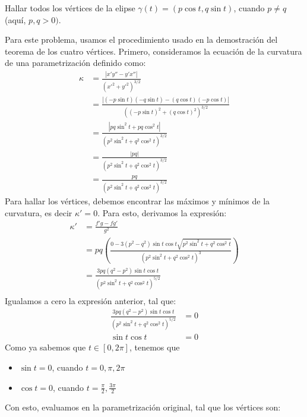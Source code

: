 \begin{problema}
    Hallar todos los vértices de la elipse $\gamma(t)=(p \cos t, q \sin t)$, cuando $p \neq q$ (aquí, $p, q>0)$.
    \begin{sol}
        Para este problema, usamos el procedimiento usado en la demostración del teorema de los cuatro vértices. 
        Primero, consideramos la ecuación de la curvatura de una parametrización definido como: 
        \begin{align*}
            \kappa &= \frac{|x'y''-y'x''|}{(x'^2+y'^2)^{3/2}}\\
            &= \frac{|(-p\sin t)(-q\sin t)-(q\cos t)(-p\cos t)|}{((-p\sin t)^2+(q\cos t)^2)^{3/2}}\\
            &= \frac{|pq\sin^2 t+pq \cos^2 t|}{(p^2\sin^2 t+q^2\cos^2 t)^{3/2}}\\
            &= \frac{|pq|}{(p^2\sin^2 t+q^2\cos^2 t)^{3/2}}\\
            &= \frac{pq}{(p^2\sin^2 t+q^2\cos^2 t)^{3/2}}
        \end{align*}
        Para hallar los vértices, debemos encontrar las máximos y mínimos de la curvatura, es decir $\kappa'=0$. Para esto, derivamos la expresión: 
        \begin{align*}
            \kappa' &= \frac{f'g- fg'}{g^2}\\
                    &= pq\left(\frac{0-3\left(p^2-q^2\right)\sin t \cos t \sqrt{p^2 \sin^2 t + q^2 \cos^2 t}}{(p^2\sin^2 t+q^2\cos^2 t)^3}\right)\\
                    &= \frac{3pq\left(q^2-p^2\right)\sin t \cos t }{(p^2\sin^2 t+q^2\cos^2 t)^{5/2}}\\
        \end{align*}
        Igualamos a cero la expresión anterior, tal que: 
        \begin{align*}
            \frac{3pq\left(q^2-p^2\right)\sin t \cos t }{(p^2\sin^2 t+q^2\cos^2 t)^{5/2}} &= 0\\
            \sin t \cos t &= 0
        \end{align*}
        Como ya sabemos que $t\in [0,2\pi]$, tenemos que 
        \begin{itemize}
            \item $\sin t = 0$, cuando $t=0,\pi,2\pi$
            \item $\cos t = 0$, cuando $t=\frac{\pi}{2},\frac{3\pi}{2}$
        \end{itemize}
        Con esto, evaluamos en la parametrización original, tal que los vértices son: 

\end{sol}
\end{problema}
